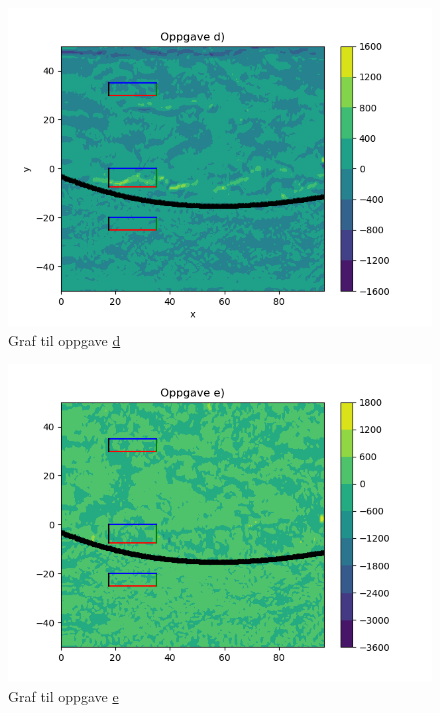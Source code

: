 \documentclass[a4paper,10pt,norsk]{article}
\begin{document}
	\begin{figure}[h!]
		\centering
		\caption{Graf til oppgave \hyperref[ass:d]{d}}
		\label{fig:d}
		\includegraphics{oppgave_d.png}
	\end{figure}
	\begin{figure}[h!]
		\centering
		\caption{Graf til oppgave \hyperref[ass:e]{e}}
		\label{fig:e}
		\includegraphics{oppgave_e.png}
	\end{figure}
		
\end{document}
